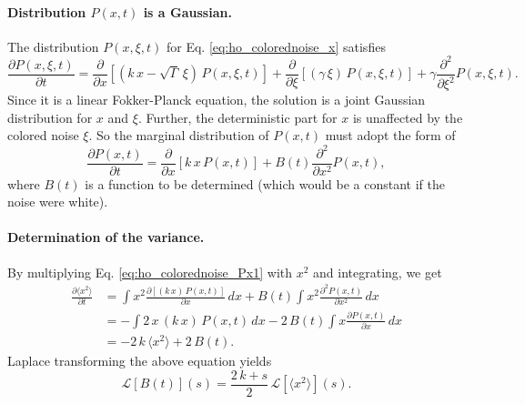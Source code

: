 \documentclass{article}
\begin{document}
\paragraph{Distribution $P(x, t)$ is a Gaussian.}

The distribution $P(x, \xi, t)$ for
Eq. \eqref{eq:ho_colorednoise_x} satisfies
$$
\frac{ \partial P(x, \xi, t) } { \partial t }
=
\frac{ \partial } { \partial x }
\left[
  \left(k \, x - \sqrt{\Gamma} \, \xi \right) \, P(x, \xi, t)
\right]
+
\frac{ \partial } { \partial \xi }
\left[
  (\gamma \, \xi ) \, P(x, \xi, t)
\right]
+
\gamma
\frac{ \partial^2 } { \partial \xi^2} P(x, \xi, t).
$$
Since it is a linear Fokker-Planck equation,
the solution is a joint Gaussian distribution
for $x$ and $\xi$.
%
Further, the deterministic part for $x$
is unaffected by the colored noise $\xi$.
%
So the marginal distribution of $P(x, t)$
must adopt the form of
\begin{equation}
\frac{ \partial P(x, t) } { \partial t }
=
\frac{ \partial } { \partial x }
\left[
  k \, x \, P(x, t)
\right]
+
B(t)
\frac{ \partial^2 } { \partial x^2} P(x, t),
\label{eq:ho_colorednoise_Px1}
\end{equation}
where $B(t)$
is a function to be determined
(which would be a constant if the noise were white).

\paragraph{Determination of the variance.}

By multiplying Eq. \eqref{eq:ho_colorednoise_Px1} with $x^2$ and integrating,
we get
$$
\begin{aligned}
\frac{ \partial \langle x^2 \rangle } { \partial t }
&=
\int x^2 \frac{ \partial [(k \, x) \, P(x, t) ] } { \partial x} \, dx
+ B(t) \int x^2 \frac{ \partial^2 P(x, t) } { \partial x^2 } \, dx
\\
&=
-\int 2 \, x \, (k \, x) \, P(x, t) \, dx
- 2 \, B(t) \int x \frac{ \partial P(x, t) } { \partial x } \, dx
\\
&=
- 2 \, k \, \langle x^2 \rangle
+ 2 \, B(t).
\end{aligned}
$$
Laplace transforming the above equation yields
\begin{equation}
\mathcal L[ B(t) ](s) = \frac{2 \, k + s}{2} \, \mathcal L[\langle x^2 \rangle](s).
\label{eq:Laplace_B_x^2}
\end{equation}
\end{document}
